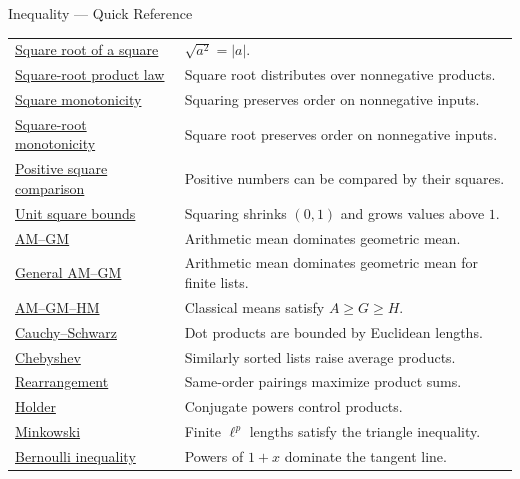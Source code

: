 \begin{toolkitbox}{Inequality --- Quick Reference}
\begin{tabular}{l l}
\hyperref[thm:sqrt-of-square-absolute-value]{Square root of a square} & $\sqrt{a^2}=|a|$.\\
\hyperref[thm:sqrt-product]{Square-root product law} & Square root distributes over nonnegative products.\\
\hyperref[thm:ineq-square-monotone]{Square monotonicity} & Squaring preserves order on nonnegative inputs.\\
\hyperref[thm:ineq-square-root-monotone]{Square-root monotonicity} & Square root preserves order on nonnegative inputs.\\
\hyperref[thm:positive-square-comparison]{Positive square comparison} & Positive numbers can be compared by their squares.\\
\hyperref[thm:unit-interval-square-bounds]{Unit square bounds} & Squaring shrinks $(0,1)$ and grows values above $1$.\\
\hyperref[thm:ineq-am-gm-two]{AM--GM} & Arithmetic mean dominates geometric mean.\\
\hyperref[thm:ineq-am-gm]{General AM--GM} & Arithmetic mean dominates geometric mean for finite lists.\\
\hyperref[thm:ineq-am-gm-hm]{AM--GM--HM} & Classical means satisfy $A\ge G\ge H$.\\
\hyperref[thm:ineq-cauchy-schwarz]{Cauchy--Schwarz} & Dot products are bounded by Euclidean lengths.\\
\hyperref[thm:ineq-chebyshev-sum]{Chebyshev} & Similarly sorted lists raise average products.\\
\hyperref[thm:ineq-rearrangement]{Rearrangement} & Same-order pairings maximize product sums.\\
\hyperref[thm:ineq-holder]{Holder} & Conjugate powers control products.\\
\hyperref[thm:ineq-minkowski]{Minkowski} & Finite $\ell^p$ lengths satisfy the triangle inequality.\\
\hyperref[thm:ineq-bernoulli]{Bernoulli inequality} & Powers of $1+x$ dominate the tangent line.\\
\bottomrule
\end{tabular}
\end{toolkitbox}


